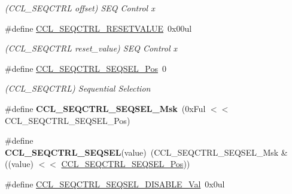 \begin{DoxyCompactItemize}
\begin{DoxyCompactList}\small\item\em (C\+C\+L\+\_\+\+S\+E\+Q\+C\+T\+R\+L offset) S\+E\+Q Control x \end{DoxyCompactList}\item 
\hypertarget{group___s_a_m_l21___c_c_l_ga9162180b372efd330d8f9e5f30b1c904}{}\#define \hyperlink{group___s_a_m_l21___c_c_l_ga9162180b372efd330d8f9e5f30b1c904}{C\+C\+L\+\_\+\+S\+E\+Q\+C\+T\+R\+L\+\_\+\+R\+E\+S\+E\+T\+V\+A\+L\+U\+E}~0x00ul\label{group___s_a_m_l21___c_c_l_ga9162180b372efd330d8f9e5f30b1c904}

\begin{DoxyCompactList}\small\item\em (C\+C\+L\+\_\+\+S\+E\+Q\+C\+T\+R\+L reset\+\_\+value) S\+E\+Q Control x \end{DoxyCompactList}\item 
\hypertarget{group___s_a_m_l21___c_c_l_gab6ac81501f16a9835f3eee86922b8f3e}{}\#define \hyperlink{group___s_a_m_l21___c_c_l_gab6ac81501f16a9835f3eee86922b8f3e}{C\+C\+L\+\_\+\+S\+E\+Q\+C\+T\+R\+L\+\_\+\+S\+E\+Q\+S\+E\+L\+\_\+\+Pos}~0\label{group___s_a_m_l21___c_c_l_gab6ac81501f16a9835f3eee86922b8f3e}

\begin{DoxyCompactList}\small\item\em (C\+C\+L\+\_\+\+S\+E\+Q\+C\+T\+R\+L) Sequential Selection \end{DoxyCompactList}\item 
\hypertarget{group___s_a_m_l21___c_c_l_gabbc9ec9b0dcca40f589e168b31819f83}{}\#define {\bfseries C\+C\+L\+\_\+\+S\+E\+Q\+C\+T\+R\+L\+\_\+\+S\+E\+Q\+S\+E\+L\+\_\+\+Msk}~(0x\+Ful $<$$<$ C\+C\+L\+\_\+\+S\+E\+Q\+C\+T\+R\+L\+\_\+\+S\+E\+Q\+S\+E\+L\+\_\+\+Pos)\label{group___s_a_m_l21___c_c_l_gabbc9ec9b0dcca40f589e168b31819f83}

\item 
\hypertarget{group___s_a_m_l21___c_c_l_ga9702c8de3bb92d30d83edbb39dc45011}{}\#define {\bfseries C\+C\+L\+\_\+\+S\+E\+Q\+C\+T\+R\+L\+\_\+\+S\+E\+Q\+S\+E\+L}(value)~(C\+C\+L\+\_\+\+S\+E\+Q\+C\+T\+R\+L\+\_\+\+S\+E\+Q\+S\+E\+L\+\_\+\+Msk \& ((value) $<$$<$ \hyperlink{group___s_a_m_l21___c_c_l_gab6ac81501f16a9835f3eee86922b8f3e}{C\+C\+L\+\_\+\+S\+E\+Q\+C\+T\+R\+L\+\_\+\+S\+E\+Q\+S\+E\+L\+\_\+\+Pos}))\label{group___s_a_m_l21___c_c_l_ga9702c8de3bb92d30d83edbb39dc45011}

\item 
\hypertarget{group___s_a_m_l21___c_c_l_gaba921443415ad6fa30496a97f2276865}{}\#define \hyperlink{group___s_a_m_l21___c_c_l_gaba921443415ad6fa30496a97f2276865}{C\+C\+L\+\_\+\+S\+E\+Q\+C\+T\+R\+L\+\_\+\+S\+E\+Q\+S\+E\+L\+\_\+\+D\+I\+S\+A\+B\+L\+E\+\_\+\+Val}~0x0ul\label{group___s_a_m_l21___c_c_l_gaba921443415ad6fa30496a97f2276865}


\end{DoxyCompactItemize}
